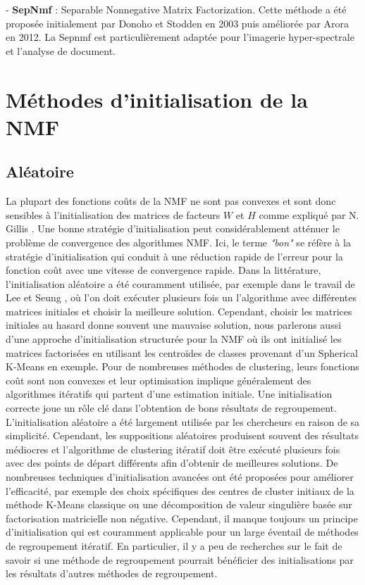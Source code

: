 \documentclass[runningheads]{llncs}
\begin{document}
 - \textbf{SepNmf} : Separable Nonnegative Matrix Factorization. Cette méthode a été proposée initialement par Donoho et Stodden en 2003 puis améliorée par Arora en 2012. La Sepnmf est particulièrement adaptée pour l'imagerie hyper-spectrale et l'analyse de document. \\

\section{Méthodes d'initialisation de la NMF}

\subsection{Aléatoire}
La plupart des fonctions coûts de la NMF ne sont pas convexes et sont donc sensibles à l'initialisation des matrices de facteurs $W$ et $H$ comme expliqué par N. Gillis \cite{Gillis2014}. Une bonne stratégie d'initialisation peut considérablement atténuer le problème de convergence des algorithmes NMF. Ici, le terme \textit{"bon"} se réfère à la stratégie d'initialisation qui conduit à une réduction rapide de l'erreur pour la fonction coût avec une vitesse de convergence rapide. Dans la littérature, l'initialisation aléatoire a été couramment utilisée, par exemple dans le travail de Lee et Seung \cite{Lee2001}, où l'on doit exécuter plusieurs fois un l'algorithme avec différentes matrices initiales et choisir la meilleure solution. Cependant, choisir les matrices initiales au hasard donne souvent une mauvaise solution, nous parlerons aussi \cite{wild} d'une approche d'initialisation structurée pour la NMF où ils ont initialisé les matrices factorisées en utilisant les centroïdes de classes provenant d'un Spherical K-Means en exemple.
Pour de nombreuses méthodes de clustering, leurs fonctions coût sont non convexes et leur optimisation implique généralement des algorithmes itératifs qui partent d'une estimation initiale. Une initialisation correcte joue un rôle clé dans l'obtention de bons résultats de regroupement. L'initialisation aléatoire a été largement utilisée par les chercheurs en raison de sa simplicité. Cependant, les suppositions aléatoires produisent souvent des résultats médiocres et l'algorithme de clustering itératif doit être exécuté plusieurs fois avec des points de départ différents afin d'obtenir de meilleures solutions. De nombreuses techniques d'initialisation avancées ont été proposées pour améliorer l'efficacité, par exemple des choix spécifiques des centres de cluster initiaux de la méthode K-Means classique ou une décomposition de valeur singulière basée sur factorisation matricielle non négative. Cependant, il manque toujours un principe d'initialisation qui est couramment applicable pour un large éventail de méthodes de regroupement itératif. En particulier, il y a peu de recherches sur le fait de savoir si une méthode de regroupement pourrait bénéficier des initialisations par les résultats d'autres méthodes de regroupement.
\end{document}
